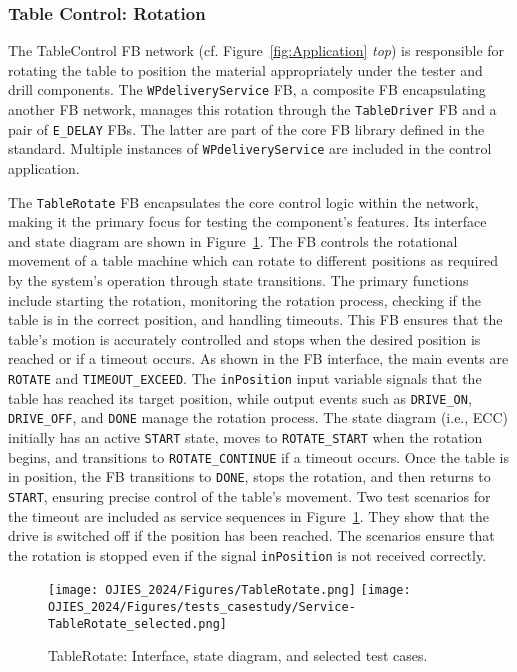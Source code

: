 \subsubsection{Table Control: Rotation}
The TableControl FB network (cf. Figure~\ref{fig:Application} \textit{top}) is responsible for rotating the table to position the material appropriately under the tester and drill components. The \texttt{WPdeliveryService} FB, a composite FB encapsulating another FB network, manages this rotation through the \texttt{TableDriver} FB and a pair of \texttt{E\_DELAY} FBs. The latter are part of the core FB library defined in the standard. Multiple instances of \texttt{WPdeliveryService} are included in the control application. 

The \texttt{TableRotate} FB encapsulates the core control logic within the network, making it the primary focus for testing the component's features. Its interface and state diagram are shown in Figure~\ref{fig:TableRotate}. The FB controls the rotational movement of a table machine which can rotate to different positions as required by the system's operation through state transitions. The primary functions include starting the rotation, monitoring the rotation process, checking if the table is in the correct position, and handling timeouts. This FB ensures that the table's motion is accurately controlled and stops when the desired position is reached or if a timeout occurs. As shown in the FB interface, the main events are \texttt{ROTATE} and \texttt{TIMEOUT\_EXCEED}. The \texttt{inPosition} input variable signals that the table has reached its target position, while output events such as \texttt{DRIVE\_ON}, \texttt{DRIVE\_OFF}, and \texttt{DONE} manage the rotation process. The state diagram (i.e., ECC) initially has an active \texttt{START} state, moves to \texttt{ROTATE\_START} when the rotation begins, and transitions to \texttt{ROTATE\_CONTINUE} if a timeout occurs. Once the table is in position, the FB transitions to \texttt{DONE}, stops the rotation, and then returns to \texttt{START}, ensuring precise control of the table's movement. Two test scenarios for the timeout are included as service sequences in Figure~\ref{fig:TableRotate}. They show that the drive is switched off if the position has been reached. The scenarios ensure that the rotation is stopped even if the signal \texttt{inPosition} is not received correctly. 
\begin{figure}[bt]
	\centering
		\texttt{[image: OJIES\_2024/Figures/TableRotate.png]}
            \texttt{[image: OJIES\_2024/Figures/tests\_casestudy/Service-TableRotate\_selected.png]}
        \caption{TableRotate: Interface, state diagram, and selected test cases.}
		\label{fig:TableRotate}	
 \end{figure}
